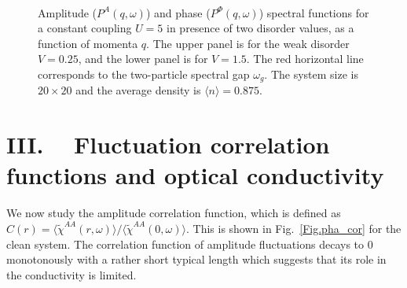 \documentclass[Colective.tex]{revtex4-1}
\begin{document}
\begin{figure}[H]
	\begin{center}
		\\
		\caption{ Amplitude ($P^A(q,\omega)$) and phase ($P^\Phi(q,\omega)$) spectral functions for a constant coupling $U=5$ in presence of two disorder values, as a function of momenta $q$. The upper panel is for the weak disorder $V=0.25$, and the lower panel is for $V=1.5$. The red horizontal line corresponds to the two-particle spectral gap $\omega_g.$ The system size is $20\times20 $ and the average density is $\langle n \rangle =0.875$.
		} \label{Fig.amp_pha_U5}
	\end{center}
\end{figure}

\section{III.\,\,\,\,\,\,      Fluctuation correlation functions and optical conductivity}
We now study the amplitude correlation function, which is defined as $C(r)=\langle\tilde{\chi}^{AA}(r,\omega)\rangle/\langle\tilde{\chi}^{AA}(0,\omega)\rangle$. This is shown in Fig.~{\ref{Fig.pha_cor}} for the clean system. {The correlation function of amplitude fluctuations decays to $0$ monotonously with a rather short typical length which suggests that its role in the conductivity is limited.}
\end{document}
